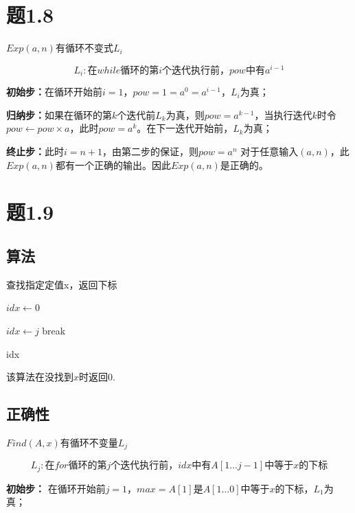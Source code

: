 \documentclass[a4paper,twoside]{article}
\begin{document}
\begin{spacing}{1.2}
\begin{algorithm}
\begin{algorithmic}[1]
	\end{algorithmic}
\end{algorithm}

\section{题1.8}

$Exp(a,n)$有循环不变式$L_i$

$$
L_i: \mbox{在$while$循环的第$i$个迭代执行前，$pow$中有$a^{i-1}$}
$$

\textbf{初始步：}在循环开始前$i=1$，$pow=1=a^0=a^{i-1}$，$L_i$为真；

\textbf{归纳步：}如果在循环的第$k$个迭代前$L_{k}$为真，则$pow=a^{k-1}$，当执行迭代$k时$令$pow \gets pow \times a$，此时$pow=a^{k}$。在下一迭代开始前，$L_k$为真；

\textbf{终止步：}此时$i=n+1$，由第二步的保证，则$pow=a^{n}$
对于任意输入$(a,n)$，此$Exp(a,n)$都有一个正确的输出。因此$Exp(a,n)$是正确的。
\section{题1.9}

\subsection{算法}

\begin{algorithm}
	\caption{查找指定定值x，返回下标}
	\begin{algorithmic}[1]
		\State $idx \gets 0$
		
		\State $idx \gets j$
		\State break
		\EndIf
		\EndFor
		
		\Return idx
		\EndProcedure
		
	\end{algorithmic}
\end{algorithm}

该算法在没找到$x$时返回0.

\subsection{正确性}

$Find(A,x)$有循环不变量$L_j$

$$
L_j: \mbox{在$for$循环的第$j$个迭代执行前，$idx$中有$A[1 \dots j-1]$中等于$x$的下标}
$$

\textbf{初始步：} 在循环开始前$j=1$，$max=A[1]$是$A[1 \dots 0]$中等于$x$的下标，$L_1$为真；


\end{spacing}
\end{document}

